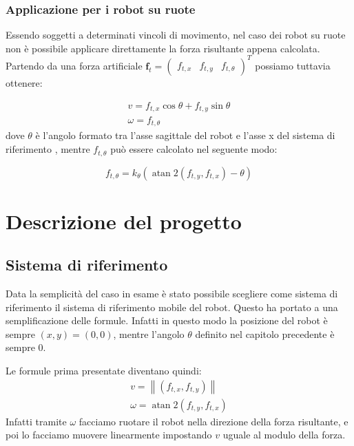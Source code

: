 \documentclass[Lau, binding=0.6cm, oneside]{sapthesis}
\begin{document}
\subsection{Applicazione per i robot su ruote}
Essendo soggetti a determinati vincoli di movimento, nel caso dei robot su ruote non è possibile applicare direttamente la forza risultante appena calcolata.
Partendo da una forza artificiale $\boldsymbol{f}_{t}=\left(\begin{array}{lll}f_{t, x} & f_{t, y} & f_{t, \theta}\end{array}\right)^{T}$ possiamo tuttavia ottenere:

$$
\begin{array}{l}
v=f_{t, x} \cos \theta+f_{t, y} \sin \theta \\
\omega=f_{t, \theta}
\end{array}
$$
dove $\theta$ è l'angolo formato tra l'asse sagittale del robot e l'asse x del sistema di riferimento \cite{fonte4}, mentre $f_{t, \theta}$ può essere calcolato nel seguente modo\cite{fonte2}:

$$
f_{t, \theta}=k_{\theta}\left(\operatorname{atan} 2\left(f_{t, y}, f_{t, x}\right)-\theta\right)
$$

\chapter{Descrizione del progetto}
\section{Sistema di riferimento}
Data la semplicità del caso in esame è stato possibile scegliere come sistema di riferimento il sistema di riferimento mobile del robot.
Questo ha portato a una semplificazione delle formule.
Infatti in questo modo la posizione del robot è sempre $\left(x, y\right)=(0,0)$, mentre l'angolo $\theta$ definito nel capitolo precedente è sempre 0.

Le formule prima presentate diventano quindi:
$$
\begin{array}{l}
v=\left\|\left(f_{t, x}, f_{t, y}\right)\right\| \\
\omega=\operatorname{atan} 2\left(f_{t, y}, f_{t, x}\right)
\end{array}
$$
Infatti tramite $\omega$ facciamo ruotare il robot nella direzione della forza risultante, e poi lo facciamo muovere linearmente impostando $v$ uguale al modulo della forza.
\end{document}
